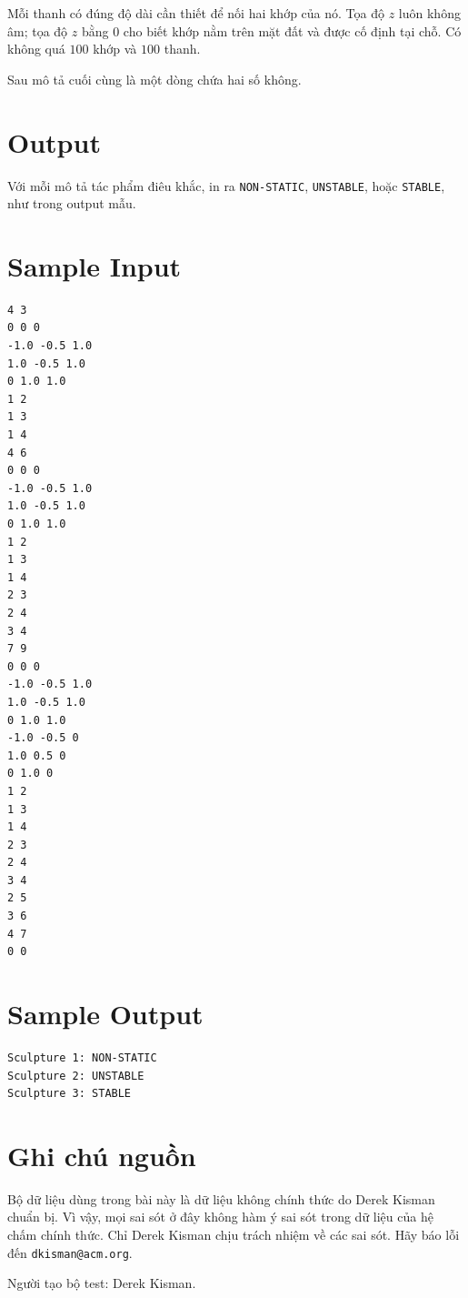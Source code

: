 \documentclass[11pt]{article}
\begin{document}
Mỗi thanh có đúng độ dài cần thiết để nối hai khớp của nó. Tọa độ $z$ luôn
không âm; tọa độ $z$ bằng $0$ cho biết khớp nằm trên mặt đất và được cố định
tại chỗ. Có không quá $100$ khớp và $100$ thanh.

Sau mô tả cuối cùng là một dòng chứa hai số không.

\section*{Output}

Với mỗi mô tả tác phẩm điêu khắc, in ra \texttt{NON-STATIC},
\texttt{UNSTABLE}, hoặc \texttt{STABLE}, như trong output mẫu.

\section*{Sample Input}

\begin{verbatim}
4 3
0 0 0
-1.0 -0.5 1.0
1.0 -0.5 1.0
0 1.0 1.0
1 2
1 3
1 4
4 6
0 0 0
-1.0 -0.5 1.0
1.0 -0.5 1.0
0 1.0 1.0
1 2
1 3
1 4
2 3
2 4
3 4
7 9
0 0 0
-1.0 -0.5 1.0
1.0 -0.5 1.0
0 1.0 1.0
-1.0 -0.5 0
1.0 0.5 0
0 1.0 0
1 2
1 3
1 4
2 3
2 4
3 4
2 5
3 6
4 7
0 0
\end{verbatim}

\section*{Sample Output}

\begin{verbatim}
Sculpture 1: NON-STATIC
Sculpture 2: UNSTABLE
Sculpture 3: STABLE
\end{verbatim}

\section*{Ghi chú nguồn}

Bộ dữ liệu dùng trong bài này là dữ liệu không chính thức do Derek Kisman chuẩn
bị. Vì vậy, mọi sai sót ở đây không hàm ý sai sót trong dữ liệu của hệ chấm
chính thức. Chỉ Derek Kisman chịu trách nhiệm về các sai sót. Hãy báo lỗi đến
\texttt{dkisman@acm.org}.

Người tạo bộ test: Derek Kisman.
\end{document}
